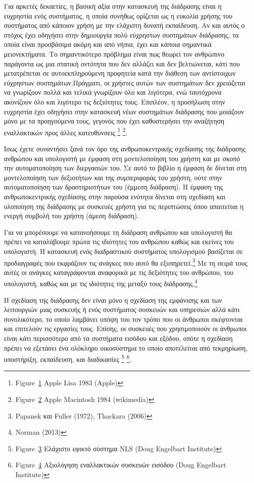 \documentclass[
]{article}
\begin{document}
Για αρκετές δεκαετίες, η βασική αξία στην κατασκευή της διάδρασης είναι
η ευχρηστία ενός συστήματος, η οποία συνήθως ορίζεται ως η ευκολία
χρήσης του συστήματος από κάποιον χρήση με την ελάχιστη δυνατή
εκπαίδευση. Αν και αυτός ο στόχος έχει οδηγήσει στην δημιουργία πολύ
εύχρηστων συστημάτων διάδρασης, τα οποία είναι προσβάσιμα ακόμη και από
νήπια, έχει και κάποια σημαντικά μειονεκτήματα. Το σημαντικότερο
πρόβλημα είναι πως θεωρεί τον ανθρώπινο παράγοντα ως μια στατική
οντότητα που δεν αλλάζει και δεν βελτιώνεται, κάτι που μετατρέπεται σε
αυτοεκπληρούμενη προφητεία κατά την διάθεση των αντίστοιχων εύχρηστων
συστημάτων.Πράγματι, οι χρήστες αυτών των συστημάτων δεν χρειάζεται να
γνωρίζουν πολλά και τελικά γνωρίζουν όλο και λιγότερα, ενώ ταυτόχρονα
ακονίζουν όλο και λιγότερο τις δεξιότητες τους. Επιπλέον, η προσήλωση
στην ευχρηστία έχει οδηγήσει στην κατασκευή νέων συστημάτων διάδρασης
που μοιάζουν μόνο με τα προηγούμενα τους, γεγονός που έχει καθυστερήσει
την αναζήτηση εναλλακτικών προς άλλες κατευθύνσεις \footnote{Figure~\protect\hyperlink{fig:apple-lisa}{1}
  Apple Lisa 1983 (Apple)} \footnote{Figure~\protect\hyperlink{fig:apple-macintosh}{2}
  Apple Macintosh 1984 (wikimedia)}.

Ίσως έχετε συναντήσει ξανά τον όρο της ανθρωποκεντρικής σχεδίασης της
διάδρασης ανθρώπου και υπολογιστή με έμφαση στη μοντελοποίηση του χρήστη
και με σκοπό την αυτοματοποίηση των διεργασιών του. Σε αυτό το βιβλίο η
έμφαση δε δίνεται στη μοντελοποίηση των δεξιοτήτων και της συμπεριφοράς
του χρήστη, ούτε στην αυτοματοποίηση των δραστηριοτήτων του (έμμεση
διάδραση). Η έμφαση της ανθρωποκεντρικής σχεδίασης στην παρούσα ενότητα
δίνεται στη σχεδίαση και υλοποίηση της διάδρασης με συσκευές χρήστη για
τις περιπτώσεις όπου απαιτείται η ενεργή συμβολή του χρήστη (άμεση
διάδραση).

Για να μπορέσουμε να κατανοήσουμε τη διάδραση ανθρώπου και υπολογιστή θα
πρέπει να καταλάβουμε πρώτα τις ιδιότητες του ανθρώπου καθώς και εκείνες
του υπολογιστή. Η κατασκευή ενός διαδραστικού συστήματος υπολογισμού
βασίζεται σε προδιαγραφές που εκφράζουν τις ανάγκες που αυτό θα
εξυπηρετεί.\footnote{Papanek και Fuller (1972), Thackara (2006)} Με τη
σειρά τους αυτές οι ανάγκες καταγράφονται αναφορικά με τις δεξιότητες
του ανθρώπου, του υπολογιστή, καθώς και με τις ιδιότητες της μεταξύ τους
διάδρασης.\footnote{Norman (2013)}

Η σχεδίαση της διάδρασης δεν είναι μόνο η σχεδίαση της εμφάνισης και των
λειτουργιών μιας συσκευής ή ενός συστήματος συσκευών και υπηρεσιών αλλά
κάτι συνολικότερο, το οποίο λαμβάνει υπόψη του τον τρόπο που οι άνθρωποι
σκέφτονται και επιτελούν τις εργασίες τους. Επίσης, οι συσκευές που
χρησιμοποιούν οι άνθρωποι είναι κάτι περισσότερο από τα συστήματα
εισόδου και εξόδου, οπότε η σχεδίαση πρέπει να εξετάσει ένα ολόκληρο
οικοσύστημα το οποίο αποτελείται από τεκμηρίωση, υποστήριξη, εκπαίδευση,
και διαδικασίες \footnote{Figure~\protect\hyperlink{fig:nls-radar-keypad}{3}
  Ελάχιστο εφικτό σύστημα NLS (Doug Engelbart Institute)} \footnote{Figure~\protect\hyperlink{fig:nls-input}{4}
  Αξιολόγηση εναλλακτικών συσκευών εισόδου (Doug Engelbart Institute)}.
\end{document}
